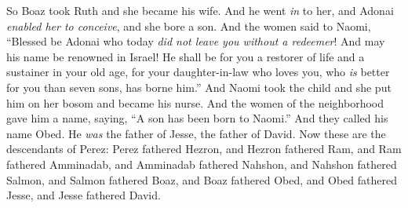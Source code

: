 \begin{biblechapter}
 So Boaz took Ruth and she became his wife. And he went \textit{in} to her, and Adonai \textit{enabled her to conceive}, and she bore a son.
\verse And the women said to Naomi, “Blessed be Adonai who today \textit{did not leave you without a redeemer}! And may his name be renowned in Israel!
\verse He shall be for you a restorer of life and a sustainer in your old age, for your daughter-in-law who loves you, who \textit{is} better for you than seven sons, has borne him.”
\verse And Naomi took the child and she put him on her bosom and became his nurse.
\verse And the women of the neighborhood gave him a name, saying, “A son has been born to Naomi.” And they called his name Obed. He \textit{was} the father of Jesse, the father of David.
\verse Now these are the descendants of Perez: Perez fathered Hezron,
\verse and Hezron fathered Ram, and Ram fathered Amminadab,
\verse and Amminadab fathered Nahshon, and Nahshon fathered Salmon,
\verse and Salmon fathered Boaz, and Boaz fathered Obed,
\verse and Obed fathered Jesse, and Jesse fathered David.
\end{biblechapter}

